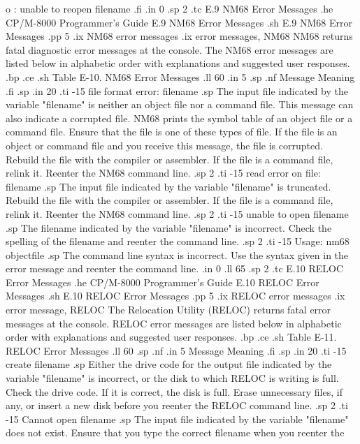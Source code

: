 o : unable to reopen filename
.fi
.in 0
.sp 2
.tc    E.9  NM68 Error Messages
.he CP/M-8000 Programmer's Guide              E.9  NM68 Error Messages
.sh
E.9  NM68 Error Messages
.pp 5
.ix NM68 error messages
.ix error messages, NM68
NM68 returns fatal diagnostic error messages at the console.  The NM68 error
messages are listed below in alphabetic order with explanations and suggested 
user responses.
.bp
.ce
.sh
Table E-10.  NM68 Error Messages
.ll 60
.in 5
.sp
.nf
Message        Meaning
.fi
.sp
.in 20
.ti -15
file format error:  filename
.sp
The input file indicated by the variable "filename" is neither an
object file nor a command file.  This message can also indicate a corrupted
file.  NM68  prints the symbol table of an object file or a command 
file.  Ensure that the file is one of these types of file.  If the 
file is an object or 
command file and you receive this message, the file is corrupted.  
Rebuild the file with the compiler or assembler.  If the file is a 
command file,  relink it.  Reenter the NM68 command line. 
.sp 2
.ti -15
read error on file:  filename
.sp
The input file indicated by the variable "filename" is truncated.  Rebuild 
the file with the compiler or assembler.  If the file is a 
command file,  relink it.  Reenter the NM68 command line. 
.sp 2
.ti -15
unable to open  filename
.sp
The filename indicated by the variable "filename" is incorrect.  Check the 
spelling of the filename and reenter the command line.
.sp 2
.ti -15
Usage:  nm68 objectfile
.sp
The command line syntax is incorrect.  Use the syntax given in the error 
message and reenter the command line.
.in 0
.ll 65
.sp 2
.tc    E.10 RELOC Error Messages
.he CP/M-8000 Programmer's Guide            E.10  RELOC Error Messages
.sh
E.10  RELOC Error Messages
.pp 5
.ix RELOC error messages
.ix error message, RELOC
The Relocation Utility (RELOC) returns fatal error messages at the 
console.  RELOC error messages are listed below in alphabetic order with
explanations and suggested user responses.
.bp
.ce
.sh
Table E-11.  RELOC Error Messages
.ll 60
.sp
.nf
.in 5
Message        Meaning
.fi
.sp
.in 20
.ti -15
create filename
.sp
Either the drive code for the output file indicated by the 
variable "filename" is incorrect, or the disk to which RELOC is writing
is full.  Check the drive code.  If it is correct, the disk is full.  Erase
unnecessary files, if any, or insert a new disk before you reenter the RELOC
command line.
.sp 2
.ti -15
Cannot open filename
.sp
The input file indicated by the variable "filename" does not 
exist.  Ensure that you type the correct filename when you reenter the 
